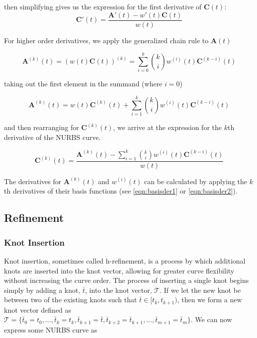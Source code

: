 then simplifying gives us the expression for the first derivative of \(\textbf{C}(t) \):
\begin{equation} 
\textbf{C}'(t) = \frac{ \textbf{A}'(t) - w'(t) \textbf{C}(t) }{ w(t) }
\end{equation}

For higher order derivatives, we apply the generalized chain rule to \(\textbf{A}(t)\)

\begin{equation} 
\textbf{A}^{(k)}(t) = (w(t)\textbf{C}(t))^{(k)} = \displaystyle \sum^k_{i=0}\binom{k}i w^{(i)} (t) \textbf{C}^{(k-i)} (t) 
\end{equation}

taking out the first element in the summand (where $i=0$)

\begin{equation} 
\textbf{A}^{(k)}(t) = w(t)\textbf{C}^{(k)}(t) + \displaystyle \sum^k_{i=1}\binom{k}i w^{(i)} (t) \textbf{C}^{(k-i)} (t) 
\end{equation}

and then rearranging for \(\textbf{C}^{(k)}(t)\), we arrive at the expression for the $k$th derivative of the NURBS curve.

\begin{equation} 
	\textbf{C}^{(k)}(t) = \frac{ \textbf{A}^{(k)}(t) - \displaystyle \sum^k_{i=1} \binom{k}i w^{(i)}(t) \textbf{C}^{(k-i)} (t) }{ w(t) }
\end{equation}

The derivatives for \(\textbf{A}^{(k)}(t)\) and \(w^{(i)}(t)\) can be calculated by applying the $k$th derivatives of their basis functions (see \cref{eqn:basisder1} or \cref{eqn:basisder2}).

\subsection{Refinement}


\subsubsection{Knot Insertion}
Knot insertion, sometimes called h-refinement, is a process by which additional knots are inserted into the knot vector, allowing for greater curve flexibility without increasing the curve order. The process of inserting a single knot begins simply by adding a knot, \(\bar{t}\), into the knot vector, \(\mathcal{T}\). If we let the new knot be between two of the existing knots such that \(\bar{t} \in [t_{k},t_{k+1})\), then we form a new knot vector defined as \(\mathcal{T}=\{\bar{t}_0=t_0,\ldots,\bar{t}_k=t_k, \bar{t}_{k+1}=\bar{t},\bar{t}_{k+2}=\bar{t}_{k+1},\ldots,\bar{t}_{m+1}=\bar{t}_m \}\). We can now express some NURBS curve as

